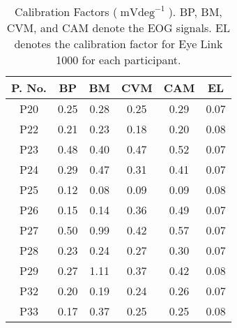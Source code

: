 \documentclass[transmag]{IEEEtran}
\begin{document}
\begin{table}[h]
	\caption{Calibration Factors ($\si{\milli\volt\deg^{-1}}$). BP, BM, CVM, and CAM denote the EOG signals. EL denotes the calibration factor for Eye Link 1000 for each participant. }
	\label{tabl3}
	\begin{center}
		\begin{tabular}{|c|c|c|c|c|c|} \hline
			
			\textbf{P. No.}		&  \textbf{BP}		& \textbf{BM}	& 	\textbf{CVM}	& 	\textbf{CAM}  &  \textbf{EL}\\ \hline
			P20		&  0.25		& 0.28	& 0.25    & 0.29	& 0.07 \\ \hline					
			P22		&  0.21		& 0.23	& 0.18    & 0.20	& 0.08 \\ \hline
			P23		&  0.48		& 0.40	& 0.47    & 0.52	& 0.07 \\ \hline		
			P24		&  0.29		& 0.47	& 0.31    & 0.41	& 0.07 \\
			\hline								
			P25		&  0.12		& 0.08	& 0.09    & 0.09	& 0.08 \\ \hline
			P26		&  0.15		& 0.14	& 0.36    & 0.49	& 0.07 \\ \hline			
			P27		&  0.50		& 0.99	& 0.42    & 0.57	& 0.07 \\ \hline			
			P28		&  0.23		& 0.24	& 0.27    & 0.30	& 0.07 \\ \hline			
			P29		&  0.27		& 1.11	& 0.37    & 0.42	& 0.08 \\ \hline			
			P32		&  0.20		& 0.19	& 0.24    & 0.26	& 0.07 \\ \hline						
			P33		&  0.17		& 0.37	& 0.25    & 0.25	& 0.08 \\ \hline					
		\end{tabular}
	\end{center}
	
\end{table}
\end{document}
